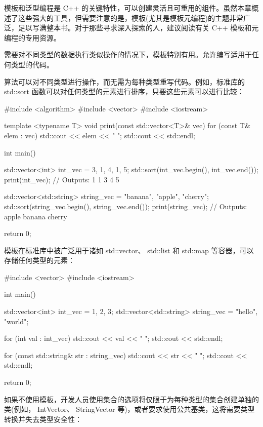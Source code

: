 模板和泛型编程是 C++ 的关键特性，可以创建灵活且可重用的组件。虽然本章概述了这些强大的工具，但需要注意的是，模板(尤其是模板元编程)的主题非常广泛，足以写满整本书。对于那些寻求深入探索的人，建议阅读有关 C++ 模板和元编程的专用资源。


需要对不同类型的数据执行类似操作的情况下，模板特别有用。允许编写适用于任何类型的代码。


算法可以对不同类型进行操作，而无需为每种类型重写代码。例如，标准库的 std::sort 函数可以对任何类型的元素进行排序，只要这些元素可以进行比较：

\begin{cpp}
#include <algorithm>
#include <vector>
#include <iostream>

template <typename T>
void print(const std::vector<T>& vec) {
    for (const T& elem : vec) {
        std::cout << elem << " ";
    }
    std::cout << std::endl;
}

int main() {
    std::vector<int> int_vec = {3, 1, 4, 1, 5};
    std::sort(int_vec.begin(), int_vec.end());
    print(int_vec); // Outputs: 1 1 3 4 5

    std::vector<std::string> string_vec = {"banana", "apple", "cherry"};
    std::sort(string_vec.begin(), string_vec.end());
    print(string_vec); // Outputs: apple banana cherry

    return 0;
}
\end{cpp}


模板在标准库中被广泛用于诸如 std::vector、 std::list 和 std::map 等容器，可以存储任何类型的元素：

\begin{cpp}
#include <vector>
#include <iostream>

int main() {
    std::vector<int> int_vec = {1, 2, 3};
    std::vector<std::string> string_vec = {"hello", "world"};

    for (int val : int_vec) {
        std::cout << val << " ";
    }
    std::cout << std::endl;

    for (const std::string& str : string_vec) {
        std::cout << str << " ";
    }
    std::cout << std::endl;

    return 0;
}
\end{cpp}

如果不使用模板，开发人员使用集合的选项将仅限于为每种类型的集合创建单独的类(例如， IntVector、 StringVector 等)，或者要求使用公共基类，这将需要类型转换并失去类型安全性：


